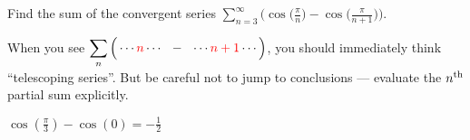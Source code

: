 \begin{Mquestion}[2016A]
Find the sum of the convergent series $\displaystyle\sum\limits_{n=3}^\infty \bigg( \!\cos\Big( \frac \pi n \Big) - \cos\Big( \frac \pi{n+1} \Big) \bigg)$.
\end{Mquestion}

\begin{hint}
When you see $\displaystyle\sum_n \Big(\cdots \textcolor{red}{n}\cdots \ \ -\ \ \cdots \textcolor{red}{n+1}\cdots\Big)$,
you should immediately think ``telescoping series''.
But be careful not to jump to conclusions --- evaluate the $n^{\rm th}$
partial sum explicitly.
\end{hint}

\begin{answer}
$\displaystyle\cos\left( \frac \pi 3 \right) - \cos(0) = -\frac{1}{2}$
\end{answer}

